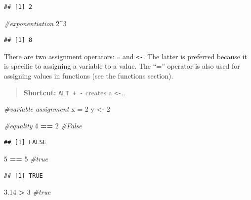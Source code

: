 \documentclass[]{book}
\newenvironment{Shaded}{\begin{snugshade}}{\end{snugshade}}
\newcommand{\CommentTok}[1]{\textcolor[rgb]{0.56,0.35,0.01}{\textit{#1}}}
\newcommand{\DecValTok}[1]{\textcolor[rgb]{0.00,0.00,0.81}{#1}}
\newcommand{\FloatTok}[1]{\textcolor[rgb]{0.00,0.00,0.81}{#1}}
\newcommand{\NormalTok}[1]{#1}
\newcommand{\OperatorTok}[1]{\textcolor[rgb]{0.81,0.36,0.00}{\textbf{#1}}}
\newcommand{\StringTok}[1]{\textcolor[rgb]{0.31,0.60,0.02}{#1}}
\begin{document}
\begin{verbatim}
## [1] 2
\end{verbatim}

\begin{Shaded}
\begin{Highlighting}[]
\CommentTok{#exponentiation}
\DecValTok{2}\OperatorTok{^}\DecValTok{3}
\end{Highlighting}
\end{Shaded}

\begin{verbatim}
## [1] 8
\end{verbatim}

There are two assignment operators: \texttt{=} and \texttt{\textless{}-}. The latter is preferred because it is specific to assigning a variable to a value. The ``='' operator is also used for assigning values in functions (see the functions section).

\begin{quote}
\textbf{Shortcut:} \texttt{ALT\ +\ -} creates a \texttt{\textless{}-}..
\end{quote}

\begin{Shaded}
\begin{Highlighting}[]
\CommentTok{#variable assignment}
\NormalTok{x =}\StringTok{ }\DecValTok{2}
\NormalTok{y <-}\StringTok{ }\DecValTok{2}

\CommentTok{#equality}
\DecValTok{4} \OperatorTok{==}\StringTok{ }\DecValTok{2} \CommentTok{#False}
\end{Highlighting}
\end{Shaded}

\begin{verbatim}
## [1] FALSE
\end{verbatim}

\begin{Shaded}
\begin{Highlighting}[]
\DecValTok{5} \OperatorTok{==}\StringTok{ }\DecValTok{5} \CommentTok{#true}
\end{Highlighting}
\end{Shaded}

\begin{verbatim}
## [1] TRUE
\end{verbatim}

\begin{Shaded}
\begin{Highlighting}[]
\FloatTok{3.14} \OperatorTok{>}\StringTok{ }\DecValTok{3} \CommentTok{#true}
\end{Highlighting}
\end{Shaded}
\end{document}
